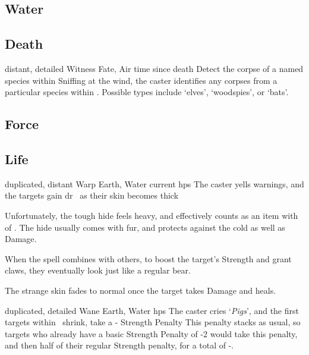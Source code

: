 \begin{multicols}{2}
\subsection{Water}


\subsection{Death}


  {distant, detailed}%
  {Witness}%
  {Fate, Air}%
  {time since death}%
  {Detect the corpse of a named species within \spellRange}%
  {
    Sniffing at the wind, the caster identifies any corpses from a particular species within \spellRange.
    Possible types include `elves', `woodspies', or `bats'.
  }

\subsection{Force}


\subsection{Life}


  {duplicated, distant}%
  {Warp}%
  {Earth, Water}%
  {current \glspl{hp}}%
  {The caster yells warnings, and the targets gain \gls{dr}~ as their skin becomes thick}%
  {Unfortunately, the tough hide feels heavy, and effectively counts as an item with  of .
  The hide usually comes with fur, and protects against the cold as well as Damage.

  When the spell combines with others, to boost the target's Strength and grant claws, they eventually look just like a regular bear.

  The strange skin fades to normal once the target takes Damage and heals.}

  {duplicated, detailed}%
  {Wane}%
  {Earth, Water}%
  {\glspl{hp}}%
  {The caster cries `\textit{Pigs}', and the first  targets within \spellRange\ shrink, take a - Strength Penalty}%
  {
  This penalty stacks as usual, so targets who already have a basic Strength Penalty of -2 would take this penalty, and then half of their regular Strength penalty, for a total of -.}


\end{multicols}
